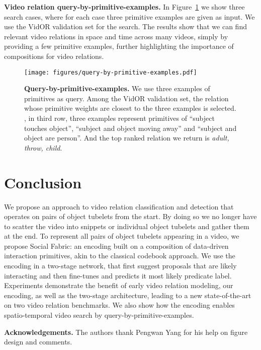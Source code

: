 \documentclass[10pt,twocolumn,letterpaper]{article}
\begin{document}
\textbf{Video relation query-by-primitive-examples.} 
In Figure~\ref{fig:retrieval} we show three search cases, where for each case three primitive examples are given as input. We use the VidOR validation set for the search. The results show that we can find relevant video relations in space and time across many videos, simply by providing a few primitive examples, further highlighting the importance of compositions for video relations.

\begin{figure}[t]
\centering
\texttt{[image: figures/query-by-primitive-examples.pdf]}
\vspace{-0.8cm}
\caption{\textbf{Query-by-primitive-examples.} We use three examples of primitives as query. Among the VidOR validation set, the relation whose primitive weights are  closest to the three examples is selected. \eg, in third row, three examples represent primitives of ``subject touches object'', ``subject and object moving away'' and ``subject and object are person''. And the top ranked relation we return is \emph{adult, throw, child}.}
\label{fig:retrieval}
\end{figure}


\section{Conclusion}
We propose an approach to video relation classification and detection that operates on pairs of object tubelets from the start. By doing so we no longer have to scatter the video into snippets or individual object tubelets and gather them at the end. To represent all pairs of object tubelets appearing in a video, we propose Social Fabric: an encoding built on a composition of data-driven interaction primitives, akin to the classical codebook approach. We use the encoding in a two-stage network, that first suggest proposals that are likely interacting and then fine-tunes and predicts it most likely predicate label. Experiments demonstrate the benefit of early video relation modeling, our encoding, as well as the two-stage architecture, leading to a new state-of-the-art on two video relation benchmarks. We also show how the encoding enables spatio-temporal video search by query-by-primitive-examples.


\textbf{Acknowledgements.} The authors thank Pengwan Yang for his help on figure design and comments.


{\small


}
\end{document}
